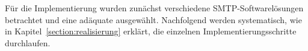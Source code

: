 Für die Implementierung wurden zunächst verschiedene SMTP-Softwarelösungen betrachtet und eine adäquate ausgewählt. Nachfolgend werden systematisch, wie in Kapitel~\ref{section:realisierung} erklärt, die einzelnen Implementierungsschritte durchlaufen.